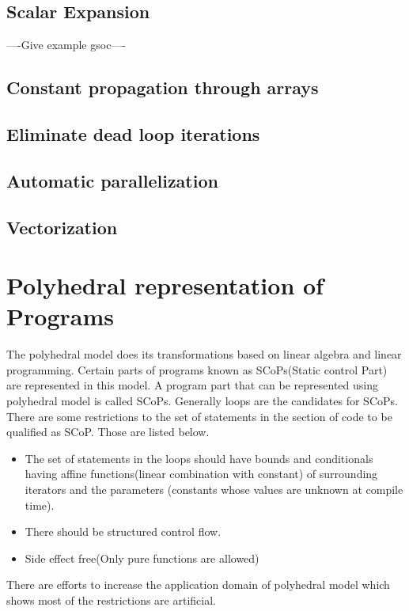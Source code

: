 \subsection{Scalar Expansion}

----Give example gsoc----

\subsection{Constant propagation through arrays}
\subsection{Eliminate dead loop iterations}
\subsection{Automatic parallelization}
\subsection{Vectorization}

\section{Polyhedral representation of Programs}

The polyhedral model does its transformations based on linear algebra and linear programming.
Certain parts of programs known as SCoPs(Static control Part) are represented in this model.
A program part that can be represented using polyhedral model is called SCoPs. Generally
loops are the candidates for SCoPs. There are some restrictions to the set of statements 
in the section of code to be qualified as SCoP. Those are listed below.

\begin{itemize}
\item The set of statements in the loops should have bounds and conditionals having affine functions(linear
combination with constant) of surrounding iterators and the parameters (constants whose values are unknown at compile time).
\item There should be structured control flow.
\item Side effect free(Only pure functions are allowed)
\end{itemize}

There are efforts to increase the application domain of polyhedral model \cite{Benabderrahmane}
which shows most of the restrictions are artificial.

